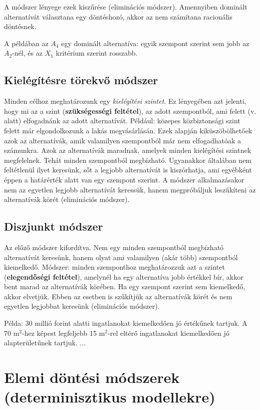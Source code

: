 \documentclass[a4paper,12pt]{article}
\begin{document}
A módszer lényege ezek kiszűrése (eliminációs módszer). Amennyiben dominált alternatívát választana egy döntéshozó, akkor az nem számítana racionális döntésnek. 

A példában az $A_4$ egy dominált alternatíva: egyik szempont szerint sem jobb az $A_2$-nél, és az $X_1$ kritérium szerint rosszabb. 

\subsection{Kielégítésre törekvő módszer}

Minden célhoz meghatározunk egy \emph{kielégítési szintet}. Ez lényegében azt jelenti, hogy mi az a szint (\textbf{szükségességi feltétel}), az adott szempontból, ami felett (v. alatt) elfogadnánk az adott alternatívát. Például: közepes közbiztonsági szint felett már elgondolkozunk a lakás megvásárlásán. Ezek alapján kiküszöbölhetőek azok az alternatívák, amik valamilyen szempontból már nem elfogadhatóak a számunkra. Azok az alternatívák maradnak, amelyek minden kielégítési szintnek megfelelnek. Tehát minden szempontból megbízható. Ugyanakkor általában nem feltétlenül ilyet keresünk, sőt a legjobb alternatívát is kiszórhatja, ami egyébként éppen a határérték alatt van egy szempont szerint. A módszer alkalmazásakor nem az egyetlen legjobb alternatívát keressük, hanem megpróbáljuk leszűkíteni az alternatívák körét (eliminációs módszer). 

\subsection{Diszjunkt módszer}

Az előző módszer kifordítva. Nem egy minden szempontból megbízható alternatívát keresünk, hanem olyat ami valamilyen (akár több) szempontból kiemelkedő. Módszer: minden szemponthoz meghatározzuk azt a szintet (\textbf{elegendőségi feltétel}), amelynél ha egy alternatíva jobb értékkel bír, akkor bent marad az alternatívák körében. Ha egy szempont szerint sem kiemelkedő, akkor elvetjük. Ebben az esetben is szűkítjük az alternatívák körét és nem egyetlen legjobbat keresünk (eliminációs módszer).

Példa: 30 millió forint alatti ingatlanokat kiemelkedően jó értékűnek tartjuk. A 70 m$^2$-hez képest legfeljebb 15 m$^2$-rel eltérő ingatlanokat kiemelkedően jó alapterületűnek tartjuk. ...


\section{Elemi döntési módszerek (determinisztikus modellekre)}
\end{document}
